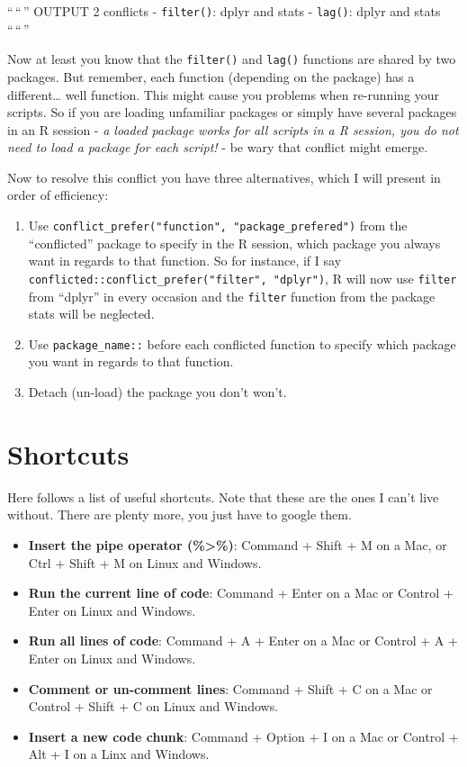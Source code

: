 \documentclass[
]{book}
\providecommand{\tightlist}{%
  \setlength{\itemsep}{0pt}\setlength{\parskip}{0pt}}
\begin{document}
``\,``\,'' OUTPUT 2 conflicts - \texttt{filter()}: dplyr and stats - \texttt{lag()}: dplyr and stats ``\,``\,''

Now at least you know that the \texttt{filter()} and \texttt{lag()} functions are shared by two packages.
But remember, each function (depending on the package) has a different\ldots{} well function.
This might cause you problems when re-running your scripts.
So if you are loading unfamiliar packages or simply have several packages in an R session - \emph{a loaded package works for all scripts in a R session, you do not need to load a package for each script!} - be wary that conflict might emerge.

Now to resolve this conflict you have three alternatives, which I will present in order of efficiency:

\begin{enumerate}
\def\labelenumi{\arabic{enumi}.}
\tightlist
\item
  Use \texttt{conflict\_prefer("function",\ "package\_prefered")} from the ``conflicted'' package to specify in the R session, which package you always want in regards to that function. So for instance, if I say \texttt{conflicted::conflict\_prefer("filter",\ "dplyr")}, R will now use \texttt{filter} from ``dplyr'' in every occasion and the \texttt{filter} function from the package stats will be neglected.
\item
  Use \texttt{package\_name::} before each conflicted function to specify which package you want in regards to that function.
\item
  Detach (un-load) the package you don't won't.
\end{enumerate}

\hypertarget{shortcuts}{%
\section{Shortcuts}\label{shortcuts}}

Here follows a list of useful shortcuts.
Note that these are the ones I can't live without.
There are plenty more, you just have to google them.

\begin{itemize}
\tightlist
\item
  \textbf{Insert the pipe operator (\%\textgreater\%)}: Command + Shift + M on a Mac, or Ctrl + Shift + M on Linux and Windows.\\
\item
  \textbf{Run the current line of code}: Command + Enter on a Mac or Control + Enter on Linux and Windows.\\
\item
  \textbf{Run all lines of code}: Command + A + Enter on a Mac or Control + A + Enter on Linux and Windows.\\
\item
  \textbf{Comment or un-comment lines}: Command + Shift + C on a Mac or Control + Shift + C on Linux and Windows.\\
\item
  \textbf{Insert a new code chunk}: Command + Option + I on a Mac or Control + Alt + I on a Linx and Windows.\\
\end{itemize}
\end{document}
